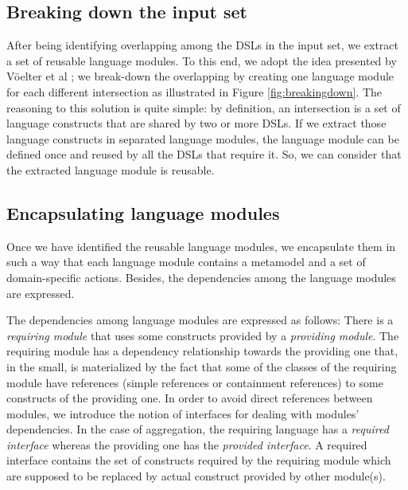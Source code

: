 \subsection{Breaking down the input set}

After being identifying overlapping among the DSLs in the input set, we extract a set of reusable language modules. To this end, we adopt the idea presented by V\"oelter et al \cite[p. 60-61]{voelter:2013}; we break-down the overlapping by creating one language module for each different intersection as illustrated in Figure \ref{fig:breakingdown}. The reasoning to this solution is quite simple: by definition, an intersection is a set of language constructs that are shared by two or more DSLs. If we extract those language constructs in separated language modules, the language module can be defined once and reused by all the DSLs that require it. So, we can consider that the extracted language module is reusable. 


\subsection{Encapsulating language modules}

Once we have identified the reusable language modules, we encapsulate them in such a way that each language module contains a metamodel and a set of domain-specific actions. Besides, the dependencies among the language modules are expressed. %

The dependencies among language modules are expressed as follows: There is a \textit{requiring module} that uses some constructs provided by a \textit{providing module}. The requiring module has a dependency relationship towards the providing one that, in the small, is materialized by the fact that some of the classes of the requiring module have references (simple references or containment references) to some constructs of the providing one. In order to avoid direct references between modules, we introduce the notion of interfaces for dealing with modules' dependencies. In the case of aggregation, the requiring language has a \textit{required interface} whereas the providing one has the \textit{provided interface}. A required interface contains the set of constructs required by the requiring module which are supposed to be replaced by actual construct provided by other module(s).

